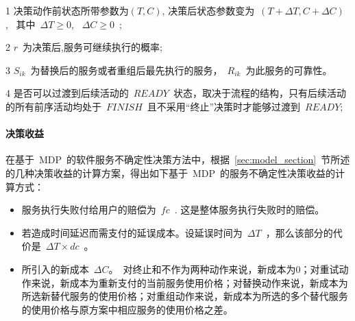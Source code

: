 \begin{table}[htbp]
\begin{threeparttable}
\begin{tabular}{llllllll}
        \end{tabular}%
        \begin{tablenotes}
            \item[1] 决策动作前状态所带参数为$(T,C)$, 决策后状态参数变为~$(T+\Delta T, C+\Delta C)$,~ 其中~$\Delta T \ge 0$, ~$\Delta C \ge 0$~; 
            \item[2] $r$~为决策后,服务可继续执行的概率;
            \item[3] $S_{ik}$~为替换后的服务或者重组后最先执行的服务，~$R_{ik}$~为此服务的可靠性。
            \item[4] 是否可以过渡到后续活动的~$READY$~状态，取决于流程的结构，只有后续活动的所有前序活动均处于~$FINISH$~且不采用“终止”决策时才能够过渡到~$READY$;
        \end{tablenotes}
    \end{threeparttable}
\end{table}%

\paragraph{决策收益}

在基于~MDP~的软件服务不确定性决策方法中，根据~\ref{sec:model_section}~节所述的几种决策收益的计算方案，得出如下基于~MDP~的服务不确定性决策收益的计算方式：

\begin{itemize}

\item 服务执行失败付给用户的赔偿为~$fc$~. 这是整体服务执行失败时的赔偿。

\item 若造成时间延迟而需支付的延误成本。设延误时间为~$\Delta T$~，那么该部分的代价是~$\Delta T \times dc$~。

\item 所引入的新成本~$\Delta C$。~对终止和不作为两种动作来说，新成本为0；对重试动作来说，新成本为重新支付的当前服务使用价格；对替换动作来说，新成本为所选新替代服务的使用价格；对重组动作来说，新成本为所选的多个替代服务的使用价格与原方案中相应服务的使用价格之差。

\end{itemize}

